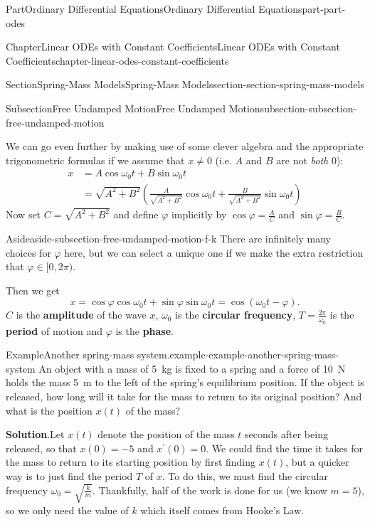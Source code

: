 \documentclass[twoside,10pt,]{book}
\newcommand{\blocktitlefont}{\relax}
\newcommand{\terminology}[1]{\textbf{#1}}
\numberwithin{equation}{part}
\begin{document}
\begin{partptx}{Part}{Ordinary Differential Equations}{}{Ordinary Differential Equations}{}{}{part-part-odes}
\begin{chapterptx}{Chapter}{Linear ODEs with Constant Coefficients}{}{Linear ODEs with Constant Coefficients}{}{}{chapter-linear-odes-constant-coefficients}
\begin{sectionptx}{Section}{Spring-Mass Models}{}{Spring-Mass Models}{}{}{section-section-spring-mass-models}
\begin{subsectionptx}{Subsection}{Free Undamped Motion}{}{Free Undamped Motion}{}{}{subsection-subsection-free-undamped-motion}
\par
We can go even further by making use of some clever algebra and the appropriate trigonometric formulas if we assume that \(x\neq0\) (i.e. \(A\) and \(B\) are not \emph{both} \(0\)):%
\begin{align*}
x & = A\cos\omega_{0}t + B\sin\omega_{0}t \\
& = \sqrt{A^{2}+B^{2}}\left(\frac{A}{\sqrt{A^{2}+B^{2}}}\cos\omega_{0}t + \frac{B}{\sqrt{A^{2} + B^{2}}}\sin\omega_{0}t\right) 
\end{align*}
Now set \(C = \sqrt{A^{2} + B^{2}}\) and define \(\varphi\) implicitly by \(\cos\varphi = \frac{A}{C}\) and \(\sin\varphi = \frac{B}{C}\). \begin{aside}{Aside}{}{aside-subsection-free-undamped-motion-f-k}%
There are infinitely many choices for \(\varphi\) here, but we can select a unique one if we make the extra restriction that \(\varphi\in[0,2\pi)\).%
\end{aside}
 Then we get%
\begin{equation*}
x = \cos\varphi\cos\omega_{0}t + \sin\varphi\sin\omega_{0}t = \cos(\omega_{0}t - \varphi).
\end{equation*}
\(C\) is the \terminology{amplitude} of the wave \(x\), \(\omega_{0}\) is the \terminology{circular frequency}, \(T = \frac{2\pi}{\omega_{0}}\) is the \terminology{period} of motion and \(\varphi\) is the \terminology{phase}.%
\begin{example}{Example}{Another spring-mass system.}{example-example-another-spring-mass-system}%
An object with a mass of \SI{5}{\kilo\gram} is fixed to a spring and a force of \SI{10}{\newton} holds the mass \SI{5}{\meter} to the left of the spring's equilibrium position. If the object is released, how long will it take for the mass to return to its original position? And what is the position \(x(t)\) of the mass?%
\par\smallskip%
\noindent\textbf{\blocktitlefont Solution}.\hypertarget{solution-example-another-spring-mass-system-c}{}\quad{}Let \(x(t)\) denote the position of the mass \(t\) seconds after being released, so that \(x(0) = -5\) and \(x^\prime(0) = 0\). We could find the time it takes for the mass to return to its starting position by first finding \(x(t)\), but a quicker way is to just find the period \(T\) of \(x\). To do this, we must find the circular frequency \(\omega_{0} = \sqrt{\frac{k}{m}}\). Thankfully, half of the work is done for us (we know \(m=5\)), so we only need the value of \(k\) which itself comes from Hooke's Law.%
\par

\end{example}
\end{subsectionptx}
\end{sectionptx}
\end{chapterptx}
\end{partptx}
\end{document}
